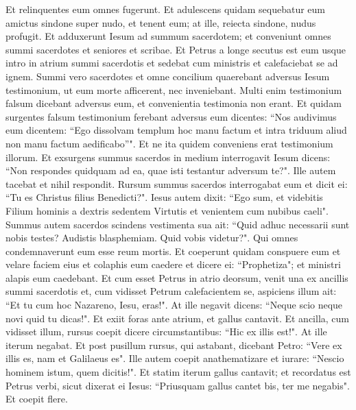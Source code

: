 \begin{biblechapter}
\verse Et relinquentes eum omnes fugerunt. 
\verse Et adulescens quidam sequebatur eum amictus sindone super nudo, et tenent eum; 
\verse at ille, reiecta sindone, nudus profugit. 
\verse Et adduxerunt Iesum ad summum sacerdotem; et conveniunt omnes summi sacerdotes et seniores et scribae. 
\verse Et Petrus a longe secutus est eum usque intro in atrium summi sacerdotis et sedebat cum ministris et calefaciebat se ad ignem. 
\verse Summi vero sacerdotes et omne concilium quaerebant adversus Iesum testimonium, ut eum morte afficerent, nec inveniebant. 
\verse Multi enim testimonium falsum dicebant adversus eum, et convenientia testimonia non erant.  
\verse Et quidam surgentes falsum testimonium ferebant adversus eum dicentes: 
\verse “Nos audivimus eum dicentem: “Ego dissolvam templum hoc manu factum et intra triduum aliud non manu factum aedificabo”". 
\verse Et ne ita quidem conveniens erat testimonium illorum. 
\verse Et exsurgens summus sacerdos in medium interrogavit Iesum dicens: “Non respondes quidquam ad ea, quae isti testantur adversum te?". 
\verse Ille autem tacebat et nihil respondit. Rursum summus sacerdos interrogabat eum et dicit ei: “Tu es Christus filius Benedicti?".  
\verse Iesus autem dixit: “Ego sum, et videbitis Filium hominis a dextris sedentem Virtutis et venientem cum nubibus caeli". 
\verse Summus autem sacerdos scindens vestimenta sua ait: “Quid adhuc necessarii sunt nobis testes? 
\verse Audistis blasphemiam. Quid vobis videtur?". Qui omnes condemnaverunt eum esse reum mortis. 
\verse Et coeperunt quidam conspuere eum et velare faciem eius et colaphis eum caedere et dicere ei: “Prophetiza"; et ministri alapis eum caedebant. 
\verse Et cum esset Petrus in atrio deorsum, venit una ex ancillis summi sacerdotis 
\verse et, cum vidisset Petrum calefacientem se, aspiciens illum ait: “Et tu cum hoc Nazareno, Iesu, eras!". 
\verse At ille negavit dicens: “Neque scio neque novi quid tu dicas!". Et exiit foras ante atrium, et gallus cantavit.  
\verse Et ancilla, cum vidisset illum, rursus coepit dicere circumstantibus: “Hic ex illis est!". 
\verse At ille iterum negabat. Et post pusillum rursus, qui astabant, dicebant Petro: “Vere ex illis es, nam et Galilaeus es". 
\verse Ille autem coepit anathematizare et iurare: “Nescio hominem istum, quem dicitis!".  
\verse Et statim iterum gallus cantavit; et recordatus est Petrus verbi, sicut dixerat ei Iesus: “Priusquam gallus cantet bis, ter me negabis". Et coepit flere. 
\end{biblechapter}

